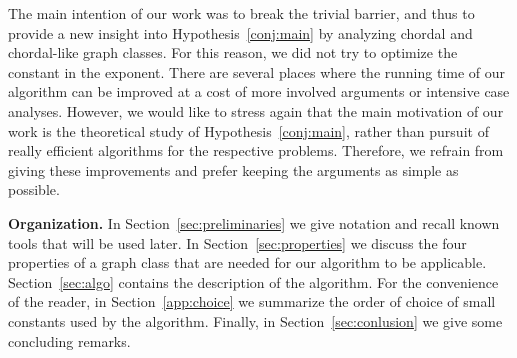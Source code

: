 The main intention of our work was to break the trivial  barrier, and thus to provide a new insight into Hypothesis~\ref{conj:main} by analyzing chordal and chordal-like graph classes. For this reason, we did not try to optimize the constant  in the exponent. There are several places where the running time of our algorithm can be improved at a cost of more involved arguments or intensive case analyses. However, we would like to stress again that the main motivation of our work is the theoretical study of Hypothesis~\ref{conj:main}, rather than pursuit of really efficient algorithms for the respective problems. Therefore, we refrain from giving these improvements and prefer keeping the arguments as simple as possible.

\smallskip\noindent\textbf{Organization.} In Section~\ref{sec:preliminaries} we give notation and recall known tools that will be used later. In Section~\ref{sec:properties} we discuss the four properties of a graph class that are needed for our algorithm to be applicable. Section~\ref{sec:algo} contains the description of the algorithm. For the convenience of the reader, in Section~\ref{app:choice} we summarize the order of choice of small constants used by the algorithm. Finally, in Section~\ref{sec:conlusion} we give some concluding remarks.
